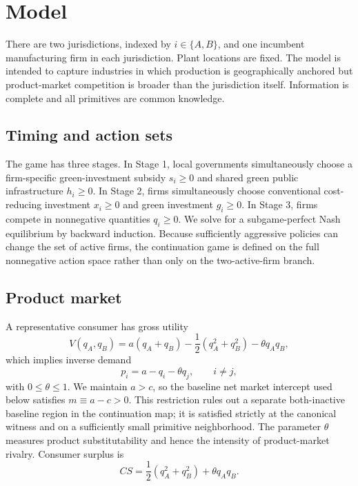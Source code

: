 \section{Model}
\label{sec:model}

There are two jurisdictions, indexed by $i\in\{A,B\}$, and one incumbent manufacturing firm in each jurisdiction. Plant locations are fixed. The model is intended to capture industries in which production is geographically anchored but product-market competition is broader than the jurisdiction itself. Information is complete and all primitives are common knowledge.

\subsection{Timing and action sets}

The game has three stages. In Stage 1, local governments simultaneously choose a firm-specific green-investment subsidy $s_i\geq0$ and shared green public infrastructure $h_i\geq0$. In Stage 2, firms simultaneously choose conventional cost-reducing investment $x_i\geq0$ and green investment $g_i\geq0$. In Stage 3, firms compete in nonnegative quantities $q_i\geq0$. We solve for a subgame-perfect Nash equilibrium by backward induction. Because sufficiently aggressive policies can change the set of active firms, the continuation game is defined on the full nonnegative action space rather than only on the two-active-firm branch.

\subsection{Product market}

A representative consumer has gross utility
\begin{equation}
V(q_A,q_B)
=a(q_A+q_B)-\frac12(q_A^2+q_B^2)-\theta q_Aq_B,
\label{eq:grossutility}
\end{equation}
which implies inverse demand
\begin{equation}
p_i=a-q_i-\theta q_j,
\qquad i\neq j,
\label{eq:inverse-demand}
\end{equation}
with $0\leq\theta\leq1$. We maintain $a>c$, so the baseline net market intercept used below satisfies $m\equiv a-c>0$. This restriction rules out a separate both-inactive baseline region in the continuation map; it is satisfied strictly at the canonical witness and on a sufficiently small primitive neighborhood. The parameter $\theta$ measures product substitutability and hence the intensity of product-market rivalry. Consumer surplus is
\begin{equation}
CS=\frac12(q_A^2+q_B^2)+\theta q_Aq_B.
\label{eq:cs}
\end{equation}

